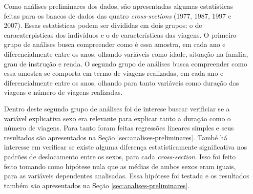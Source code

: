 \begin{quadro}[htb]
\end{quadro}

Como análises preliminares dos dados, são apresentadas algumas estatísticas feitas para os bancos de dados das quatro \emph{cross-sections} (1977, 1987, 1997 e 2007). Essas estatísticas podem ser divididas em dois grupos: o de caracaterpisticas dos indivíduos e o de características das viagens. O primeiro grupo de análises busca compreender como é essa amostra, em cada ano e diferencialmente entre os anos, olhando variáveis como idade, situação na família, grau de instrução e renda. O segundo grupo de análises busca compreender como essa amostra se comporta em termo de viagens realizadas, em cada ano e diferencialmente entre os anos, olhando para tanto variáveis como duração das viagens e número de viagens realizadas.

Dentro deste segundo grupo de análises foi de interese buscar verificiar se a variável explicativa sexo era relevante para explicar tanto a duração como o número de viagens. Para tanto foram feitas regressões lineares simples e seus resultados são apresentados na Seção \ref{sec:analises-preliminares}. També há interesse em verificar se existe alguma diferença estatisticamente significativa nos padrões de deslocamento entre os sexos, para cada \emph{cross-section}. Isso foi feito feito tomando como hipótese nula que as médias de ambos sexos eram iguais, para as variáveis dependentes analisadas. Essa hipótese foi testada e os resultados também são apresentados na Seção \ref{sec:analises-preliminares}.




